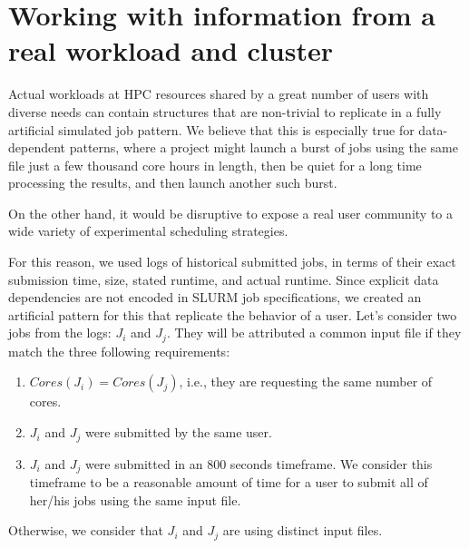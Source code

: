 \documentclass[conference,10pt]{IEEEtran}
\newcommand{\core}{\mathit{Cores}\xspace}
\begin{document}

\section{Working with information from a real workload and cluster}\label{sec.working}

Actual workloads at HPC resources shared by a great number of users with diverse needs can contain structures
that are non-trivial to replicate in a fully artificial simulated job pattern. We believe that this is especially
true for data-dependent patterns, where a project might launch a burst of jobs using the same file just a few thousand
core hours in length, then be quiet for a long time processing the results, and then launch another such burst.

On the other hand, it would be disruptive to expose a real user community to a wide variety of experimental scheduling strategies.

For this reason, we used logs of historical submitted jobs, in terms of their exact submission time, size, stated runtime, and actual runtime.
Since explicit data dependencies are not encoded in SLURM job specifications, we created an artificial pattern for this that replicate the behavior of a user.
Let's consider two jobs from the logs: $J_i$ and $J_j$.
They will be attributed a common input file if they match the three following requirements:
\begin{enumerate}
	\item $\core(J_i) = \core(J_j)$, i.e., they are requesting the same number of cores.
	\item $J_i$ and $J_j$ were submitted by the same user.
	\item $J_i$ and $J_j$ were submitted in an 800 seconds timeframe. We consider this timeframe to be a reasonable amount of time for a user to submit all of her/his jobs using the same input file.
\end{enumerate}
Otherwise, we consider that $J_i$ and $J_j$ are using distinct input files.
\end{document}
